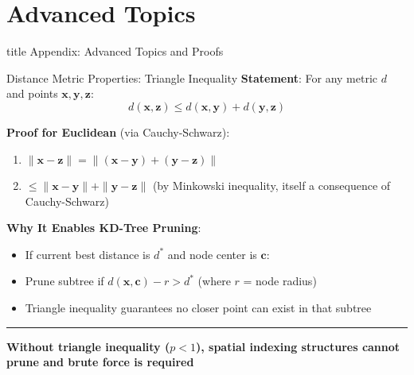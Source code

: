 \documentclass[8pt,aspectratio=169]{beamer}
\newcommand{\bottomnote}[1]{%
\vfill
\vspace{-2mm}
\textcolor{mllavender2}{\rule{\textwidth}{0.4pt}}
\vspace{1mm}
\footnotesize
\textbf{#1}
}
\begin{document}
\appendix
\section*{Advanced Topics}

\begin{frame}{}
\vfill
\begin{center}
\begin{beamercolorbox}[sep=8pt,center,shadow=true,rounded=true]{title}
Appendix: Advanced Topics and Proofs
\end{beamercolorbox}
\end{center}
\vfill
\end{frame}

\begin{frame}[t]{Distance Metric Properties: Triangle Inequality}
\textbf{Statement}: For any metric $d$ and points $\mathbf{x}, \mathbf{y}, \mathbf{z}$:
$$d(\mathbf{x}, \mathbf{z}) \leq d(\mathbf{x}, \mathbf{y}) + d(\mathbf{y}, \mathbf{z})$$

\textbf{Proof for Euclidean} (via Cauchy-Schwarz):
\begin{enumerate}
\item $\|\mathbf{x} - \mathbf{z}\| = \|(\mathbf{x} - \mathbf{y}) + (\mathbf{y} - \mathbf{z})\|$
\item $\leq \|\mathbf{x} - \mathbf{y}\| + \|\mathbf{y} - \mathbf{z}\|$ \quad (by Minkowski inequality, itself a consequence of Cauchy-Schwarz)
\end{enumerate}
\vspace{0.3em}
\textbf{Why It Enables KD-Tree Pruning}:
\begin{itemize}
\item If current best distance is $d^*$ and node center is $\mathbf{c}$:
\item Prune subtree if $d(\mathbf{x}, \mathbf{c}) - r > d^*$ (where $r$ = node radius)
\item Triangle inequality guarantees no closer point can exist in that subtree
\end{itemize}
\bottomnote{Without triangle inequality ($p < 1$), spatial indexing structures cannot prune and brute force is required}
\end{frame}
\end{document}
